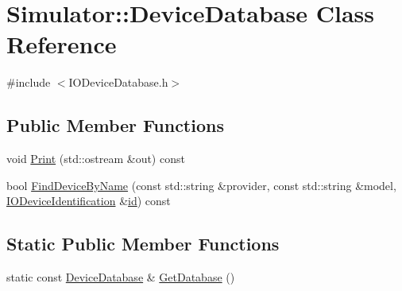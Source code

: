 \hypertarget{class_simulator_1_1_device_database}{\section{Simulator\+:\+:Device\+Database Class Reference}
\label{class_simulator_1_1_device_database}
}


{\ttfamily \#include $<$I\+O\+Device\+Database.\+h$>$}

\subsection*{Public Member Functions}
\begin{DoxyCompactItemize}
\item 
void \hyperlink{class_simulator_1_1_device_database_afd81621b3f8966efc523eed39c8c122e}{Print} (std\+::ostream \&out) const 
\item 
bool \hyperlink{class_simulator_1_1_device_database_a13dd16a55c0e55b64e66cb2142f5cb81}{Find\+Device\+By\+Name} (const std\+::string \&provider, const std\+::string \&model, \hyperlink{struct_simulator_1_1_i_o_device_identification}{I\+O\+Device\+Identification} \&\hyperlink{mtconf_8c_aa3185401f04d30bd505daebf48c39cc5}{id}) const 
\end{DoxyCompactItemize}
\subsection*{Static Public Member Functions}
\begin{DoxyCompactItemize}
\item 
static const \hyperlink{class_simulator_1_1_device_database}{Device\+Database} \& \hyperlink{class_simulator_1_1_device_database_a368f157669d26d3407ea485c4a23d56e}{Get\+Database} ()
\end{DoxyCompactItemize}


